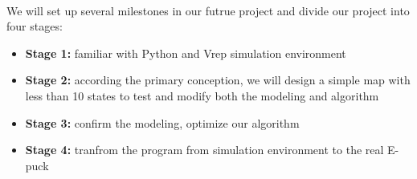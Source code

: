 \documentclass[
11pt, %
a4paper, %
oneside, %
headinclude%
BCOR3mm, %
]{scrartcl}
\begin{document}
\paragraph{}
We will set up several milestones in our futrue project and divide our project into four stages:
\begin{itemize}[noitemsep]
\item \textbf{Stage 1:} familiar with Python and Vrep simulation environment

\item \textbf{Stage 2:} according the primary conception, 
we will design a simple map with less than 10 states to test and modify both the modeling and algorithm

\item \textbf{Stage 3:} confirm the modeling, optimize our algorithm
\item \textbf{Stage 4:} tranfrom the program from simulation environment to the real E-puck
\end{itemize}




\end{document}
